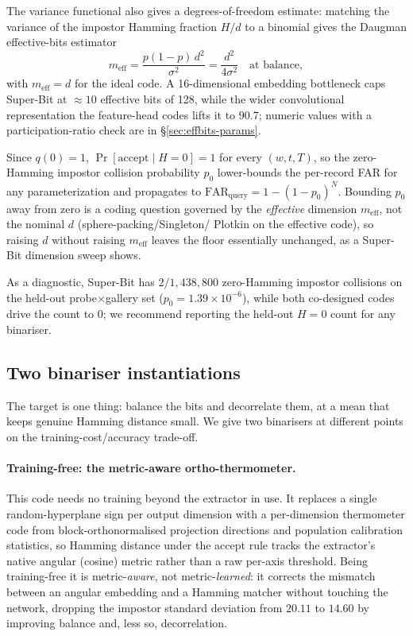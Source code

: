 The variance functional also gives a degrees-of-freedom estimate: matching the variance of the
impostor Hamming fraction $H/d$ to a binomial gives the Daugman effective-bits
estimator~\cite{Daugman03}
\begin{equation}
\label{eq:meff}
m_{\mathrm{eff}} = \frac{p(1-p)\,d^2}{\sigma^2} = \frac{d^2}{4\sigma^2} \quad\text{at balance},
\end{equation}
with $m_{\mathrm{eff}}=d$ for the ideal code. A 16-dimensional embedding bottleneck caps Super-Bit at
$\approx10$ effective bits of 128, while the wider convolutional representation the feature-head codes
lifts it to $90.7$; numeric values with a participation-ratio check are in \S\ref{sec:effbits-params}.

\begin{corollary}
\label{cor:floor}
Since $q(0)=1$, $\Pr[\text{accept}\mid H=0]=1$ for every $(w,t,T)$, so the zero-Hamming impostor
collision probability $p_0$ lower-bounds the per-record FAR for any parameterization and propagates to
$\mathrm{FAR}_{\mathrm{query}}=1-(1-p_0)^N$. Bounding $p_0$ away from zero is a coding question governed
by the \emph{effective} dimension $m_{\mathrm{eff}}$, not the nominal $d$ (sphere-packing/Singleton/
Plotkin on the effective code), so raising $d$ without raising $m_{\mathrm{eff}}$ leaves the floor
essentially unchanged, as a Super-Bit dimension sweep shows.
\end{corollary}

As a diagnostic, Super-Bit has $2/1{,}438{,}800$ zero-Hamming impostor collisions on the held-out
probe$\times$gallery set ($p_0 = 1.39\times10^{-6}$), while both co-designed codes drive the count to
$0$; we recommend reporting the held-out $H=0$ count for any binariser.

\subsection{Two binariser instantiations}
\label{sec:binarisers}

The target is one thing: balance the bits and decorrelate them, at a mean that keeps genuine Hamming
distance small. We give two binarisers at different points on the training-cost/accuracy trade-off.

\paragraph{Training-free: the metric-aware ortho-thermometer.}\label{sec:ortho-thermo}
This code needs no training beyond the extractor in use. It replaces a single random-hyperplane sign
per output dimension with a per-dimension thermometer code from block-orthonormalised projection
directions and population calibration statistics, so Hamming distance under the accept rule tracks the
extractor's native angular (cosine) metric rather than a raw per-axis threshold. Being training-free it
is metric-\emph{aware}, not metric-\emph{learned}: it corrects the mismatch between an angular embedding
and a Hamming matcher without touching the network, dropping the impostor standard deviation from
$20.11$ to $14.60$ by improving balance and, less so, decorrelation.

